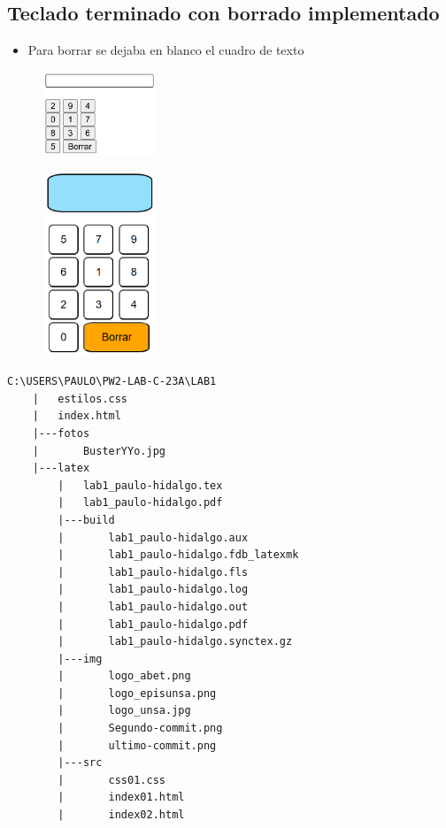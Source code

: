 \documentclass{article}
\begin{document}
\subsection{Teclado terminado con borrado implementado}
	
	\begin{itemize}	
		\item Para borrar se dejaba en blanco el cuadro de texto
	\end{itemize}
	
	
	\begin{figure}[H]
		\centering
		\includegraphics[width=0.3\textwidth,keepaspectratio]{img/tec02.png}
	\end{figure}
	\begin{figure}[H]
		\centering
		\includegraphics[width=0.3\textwidth,keepaspectratio]{img/tec03.png}
	\end{figure}
\begin{lstlisting}[style=ascii-tree]
	C:\USERS\PAULO\PW2-LAB-C-23A\LAB1
	|	estilos.css
	|	index.html
	|---fotos
	|		BusterYYo.jpg
	|---latex
		|	lab1_paulo-hidalgo.tex
		|   lab1_paulo-hidalgo.pdf
		|---build
		|		lab1_paulo-hidalgo.aux
		|       lab1_paulo-hidalgo.fdb_latexmk
		|       lab1_paulo-hidalgo.fls
		|       lab1_paulo-hidalgo.log
		|       lab1_paulo-hidalgo.out
		|       lab1_paulo-hidalgo.pdf
		|       lab1_paulo-hidalgo.synctex.gz
		|---img
		|		logo_abet.png
		|       logo_episunsa.png
		|       logo_unsa.jpg
		|       Segundo-commit.png
		|       ultimo-commit.png
		|---src
		|		css01.css
		|		index01.html
		|		index02.html
\end{lstlisting}    
	\clearpage
\end{document}
